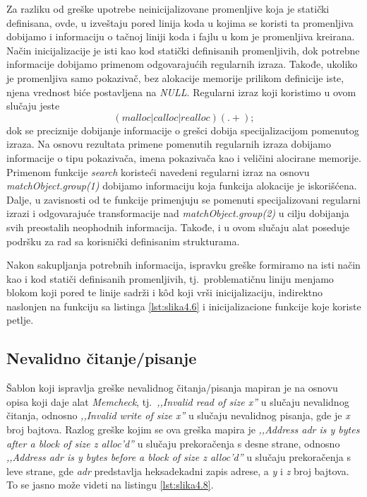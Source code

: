 \documentclass[12pt,oneside]{memoir}
\theoremstyle{plain}
\theoremstyle{definition}
\begin{document}
Za razliku od greške upotrebe neinicijalizovane promenljive koja je statički definisana, ovde, u izveštaju pored linija koda u kojima se koristi ta promenljiva dobijamo i informaciju o tačnoj liniji koda i fajlu u kom je promenljiva kreirana. Način inicijalizacije je isti kao kod statički definisanih promenljivih, dok potrebne informacije dobijamo primenom odgovarajućih regularnih izraza. Takođe, ukoliko je promenljiva samo pokazivač, bez alokacije memorije prilikom definicije iste, njena vrednost biće postavljena na \textit{NULL}. Regularni izraz koji koristimo u ovom slučaju jeste 
$$ (malloc|calloc|realloc)(.+); $$
dok se preciznije dobijanje informacije o grešci dobija specijalizacijom pomenutog izraza. Na osnovu rezultata primene pomenutih regularnih izraza dobijamo informacije o tipu pokazivača, imena pokazivača kao i veličini alocirane memorije. Primenom funkcije \textit{search} koristeći navedeni regularni izraz na osnovu \textit{matchObject.group(1)} dobijamo informaciju koja funkcija alokacije je iskorišćena. Dalje, u zavisnosti od te funkcije primenjuju se pomenuti specijalizovani regularni izrazi i odgovarajuće transformacije nad  \textit{matchObject.group(2)} u cilju dobijanja svih preostalih neophodnih informacija. Takođe, i u ovom slučaju alat poseduje podršku za rad sa korisnički definisanim strukturama. 

Nakon sakupljanja potrebnih informacija, ispravku greške formiramo na isti način kao i kod statiči definisanih promenljivih, tj.~problematičnu liniju menjamo blokom koji pored te linije sadrži i k\^od koji vrši inicijalizaciju, indirektno naslonjen na funkciju sa listinga \ref{lst:slika4.6} i inicijalizacione funkcije koje koriste petlje.

\subsection{Nevalidno čitanje/pisanje}
Šablon koji ispravlja greške nevalidnog čitanja/pisanja mapiran je na osnovu opisa koji daje alat \textit{Memcheck}, tj.~\textit{,,Invalid read of size x''} u slučaju nevalidnog čitanja, odnosno \textit{,,Invalid write of size x''} u slučaju nevalidnog pisanja, gde je \textit{x} broj bajtova. Razlog greške kojim se ova greška mapira je \textit{,,Address adr is y bytes after a block of size z alloc'd''} u slučaju prekoračenja s desne strane, odnosno \textit{,,Address adr is y bytes before a block of size z alloc'd''} u slučaju prekoračenja s leve strane, gde \textit{adr} predstavlja heksadekadni zapis adrese, a \textit{y} i \textit{z} broj bajtova. To se jasno može videti na listingu \ref{lst:slika4.8}.
\end{document}

